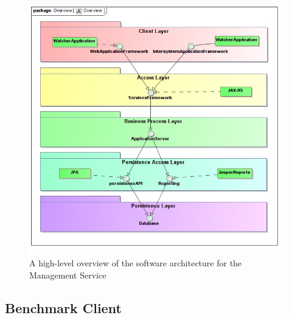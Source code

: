 \begin{figure}[H]
  \begin{center}
  \includegraphics[scale=0.4]{../Diagrams and Charts/Overview/Overview.jpg}
  \caption{A high-level overview of the software architecture for the Management Service}
  \label{fig:managementSoftwareArchitecture}
  \end{center}
\end{figure}

\subsection{Benchmark Client}
